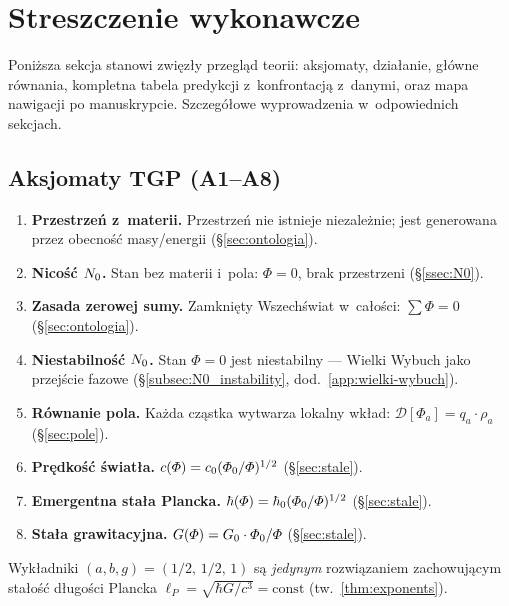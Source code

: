 \section*{Streszczenie wykonawcze}\label{sec:executive-summary}

\noindent
Poni\.zsza sekcja stanowi zwi\k{e}z\l{}y przegl\k{a}d teorii:
aksjomaty, dzia\l{}anie, g\l{}\'owne r\'ownania, kompletna tabela
predykcji z~konfrontacj\k{a} z~danymi, oraz mapa nawigacji po
manuskrypcie. Szczeg\'o\l{}owe wyprowadzenia w~odpowiednich sekcjach.

\subsection*{Aksjomaty TGP (A1--A8)}

\begin{enumerate}[label=\textbf{A\arabic*}.,leftmargin=2em]
\item \textbf{Przestrze\'n z~materii.}
  Przestrze\'n nie istnieje niezale\.znie; jest generowana
  przez obecno\'s\'c masy/energii (\S\ref{sec:ontologia}).
\item \textbf{Nico\'s\'c $N_0$.}
  Stan bez materii i~pola: $\Phi = 0$, brak przestrzeni (\S\ref{ssec:N0}).
\item \textbf{Zasada zerowej sumy.}
  Zamkni\k{e}ty Wszech\'swiat w~ca\l{}o\'sci: $\sum \Phi = 0$ (\S\ref{sec:ontologia}).
\item \textbf{Niestabilno\'s\'c $N_0$.}
  Stan $\Phi = 0$ jest niestabilny --- Wielki Wybuch jako
  przej\'scie fazowe (\S\ref{subsec:N0_instability}, dod.~\ref{app:wielki-wybuch}).
\item \textbf{R\'ownanie pola.}
  Ka\.zda cz\k{a}stka wytwarza lokalny wk\l{}ad:
  $\mathcal{D}[\Phi_a] = q_a \cdot \rho_a$ (\S\ref{sec:pole}).
\item \textbf{Pr\k{e}dko\'s\'c \'swiat\l{}a.}
  $c(\varPhi) = c_0 (\varPhi_0/\varPhi)^{1/2}$ (\S\ref{sec:stale}).
\item \textbf{Emergentna sta\l{}a Plancka.}
  $\hbar(\varPhi) = \hbar_0 (\varPhi_0/\varPhi)^{1/2}$ (\S\ref{sec:stale}).
\item \textbf{Sta\l{}a grawitacyjna.}
  $G(\varPhi) = G_0 \cdot \varPhi_0/\varPhi$ (\S\ref{sec:stale}).
\end{enumerate}
\noindent
Wyk\l{}adniki $(a, b, g) = (1/2,\, 1/2,\, 1)$ s\k{a}
\emph{jedynym} rozwi\k{a}zaniem
zachowuj\k{a}cym sta\l{}o\'s\'c d\l{}ugo\'sci Plancka
$\ell_P = \sqrt{\hbar G/c^3} = \mathrm{const}$
(tw.~\ref{thm:exponents}).

